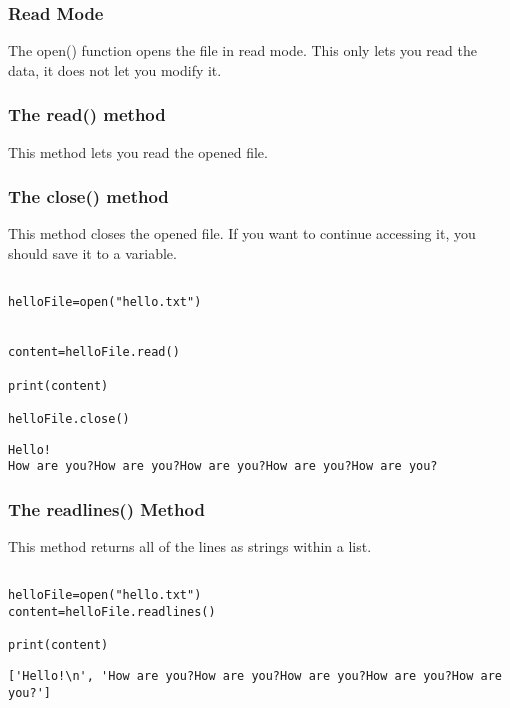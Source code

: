 \documentclass[11pt]{article}
\begin{document}
\subsubsection{Read Mode}
\label{sec:org541cdde}

The open() function opens the file in read mode. This only lets you read the data, it does not let you modify it.

\subsubsection{The read() method}
\label{sec:orgf42615a}

This method lets you read the opened file.

\subsubsection{The close() method}
\label{sec:org4c45975}

This method closes the opened file. If you want to continue accessing it, you should save it to a variable.

\begin{verbatim}

helloFile=open("hello.txt")


content=helloFile.read()

print(content)

helloFile.close()

\end{verbatim}

\begin{verbatim}
Hello!
How are you?How are you?How are you?How are you?How are you?
\end{verbatim}

\subsubsection{The readlines() Method}
\label{sec:org8fb95be}

This method returns all of the lines as strings within a list.

\begin{verbatim}

helloFile=open("hello.txt")
content=helloFile.readlines()

print(content)

\end{verbatim}

\begin{verbatim}
['Hello!\n', 'How are you?How are you?How are you?How are you?How are you?']
\end{verbatim}
\end{document}

